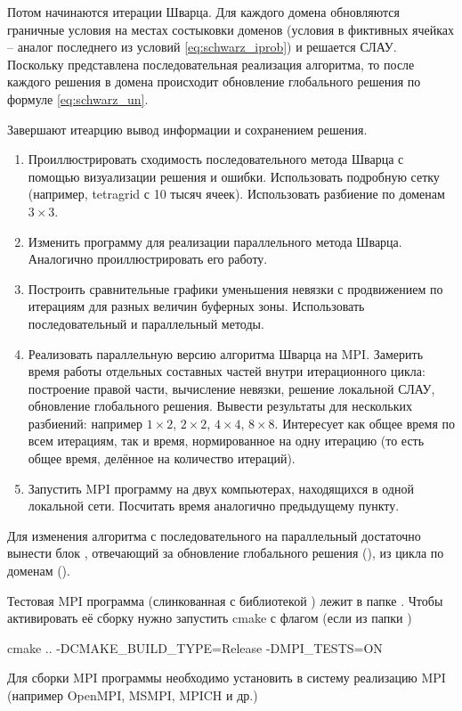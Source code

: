 Потом начинаются итерации Шварца.
Для каждого домена обновляются граничные условия на местах состыковки доменов (условия в фиктивных ячейках -- аналог последнего из условий \cref{eq:schwarz_iprob})
и решается СЛАУ.
Поскольку представлена последовательная реализация алгоритма, то после каждого решения в домена
происходит обновление глобального решения по формуле \cref{eq:schwarz_un}.

Завершают итеарцию вывод информации и сохранением решения.


\begin{enumerate}
\item Проиллюстрировать сходимость последовательного метода Шварца с помощью визуализации решения и ошибки. Использовать подробную сетку (например, tetragrid с 10 тысяч ячеек).
      Использовать разбиение по доменам $3\times3$.
\item Изменить программу для реализации параллельного метода Шварца. Аналогично проиллюстрировать его работу.
\item Построить сравнительные графики уменьшения невязки с продвижением по итерациям для разных величин буферных зоны. Использовать последовательный и параллельный методы.
\item Реализовать параллельную версию алгоритма Шварца на MPI. Замерить время работы отдельных составных частей внутри итерационного цикла: построение правой части, вычисление невязки, решение локальной СЛАУ, обновление глобального решения. Вывести результаты для нескольких разбиений: например $1\times2$, $2\times2$, $4\times4$, $8\times8$. Интересует как общее время по всем итерациям, так и время, нормированное на одну итерацию (то есть общее время, делённое на количество итераций).
\item Запустить MPI программу на двух компьютерах, находящихся в одной локальной сети. Посчитать время аналогично предыдущему пункту.
\end{enumerate}

Для изменения алгоритма с последовательного на параллельный достаточно вынести блок , отвечающий за обновление глобального решения (),
из цикла по доменам ().

Тестовая MPI программа (слинкованная с библиотекой ) лежит в папке .
Чтобы активировать её сборку нужно запустить cmake с флагом (если из папки )
\begin{bashcode}
cmake .. -DCMAKE_BUILD_TYPE=Release -DMPI_TESTS=ON
\end{bashcode}
Для сборки MPI программы необходимо установить в систему реализацию MPI (например OpenMPI, MSMPI, MPICH и др.)

